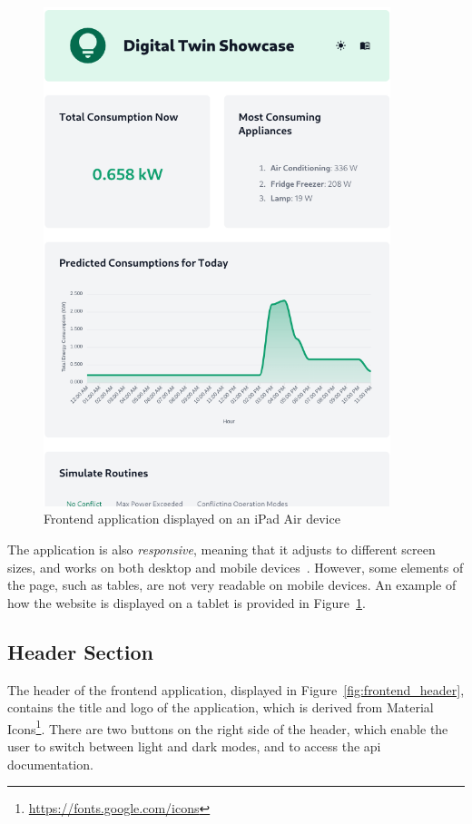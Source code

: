\begin{figure}
    \centering
    \includegraphics[width=0.9\textwidth]{images/frontend/responsive.png}
    \caption{Frontend application displayed on an iPad Air device}%
    \label{fig:frontend_responsive}
\end{figure}

The application is also \textit{responsive}, meaning that it adjusts to different screen sizes, and works on both desktop and mobile devices~\parencite{marcotteResponsiveWebDesign2010}. However, some elements of the page, such as tables, are not very readable on mobile devices. An example of how the website is displayed on a tablet is provided in Figure~\ref{fig:frontend_responsive}. 

\subsection{Header Section}

The header of the frontend application, displayed in Figure~\ref{fig:frontend_header}, contains the title and logo of the application, which is derived from Material Icons\footnote{\url{https://fonts.google.com/icons}}. There are two buttons on the right side of the header, which enable the user to switch between light and dark modes, and to access the \acrshort{api} documentation.

